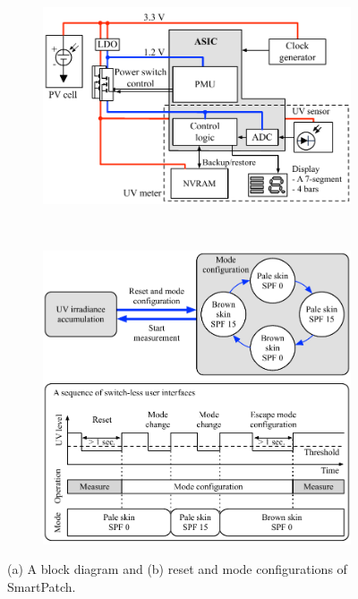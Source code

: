 \documentclass[journal]{IEEEtran}
\begin{document}
\begin{figure}
\centering
	\begin{subfigure}{0.45\textwidth}
	\includegraphics[width=1.0\hsize]{Figures/block_diagram.pdf}
	\caption{}
	\label{fig:block_diagram}
	\end{subfigure}
~
	\begin{subfigure}{0.45\textwidth}
	\includegraphics[width=1.0\hsize]{Figures/configuration.pdf}
	\caption{}
	\label{fig:configuration}
	\end{subfigure}
\caption{(a) A block diagram and (b) reset and mode configurations of SmartPatch.}
\end{figure}
\end{document}
